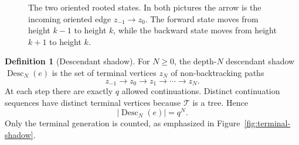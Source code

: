 \documentclass[11pt]{amsart}
\theoremstyle{definition}
\newtheorem{definition}{Definition}[section]
\theoremstyle{plain}
\newcommand{\Tree}{\mathcal T}
\newcommand{\fwd}{\mathrm{fwd}}
\newcommand{\bwd}{\mathrm{bwd}}
\newcommand{\Desc}{\operatorname{Desc}}
\begin{document}
\begin{figure}[ht]
\centering
{}
\caption{The two oriented rooted states.  In both pictures the arrow is the incoming oriented edge \(z_{-1}\to z_0\).  The forward state moves from height \(k-1\) to height \(k\), while the backward state moves from height \(k+1\) to height \(k\).}
\label{fig:states}
\end{figure}

\begin{definition}[Descendant shadow]
For \(N\ge0\), the depth-\(N\) descendant shadow \(\Desc_N(e)\) is the set of
terminal vertices \(z_N\) of non-backtracking paths
\[
z_{-1}\to z_0\to z_1\to\cdots\to z_N.
\]
At each step there are exactly \(q\) allowed continuations.  Distinct
continuation sequences have distinct terminal vertices because \(\Tree\) is a
tree.  Hence
\[
|\Desc_N(e)|=q^N.
\]
Only the terminal generation is counted, as emphasized in
Figure~\ref{fig:terminal-shadow}.
\end{definition}
\end{document}
